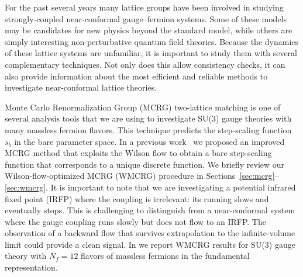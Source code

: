 
For the past several years many lattice groups have been involved in studying strongly-coupled near-conformal gauge--fermion systems.
Some of these models may be candidates for new physics beyond the standard model, while others are simply interesting non-perturbative quantum field theories.
Because the dynamics of these lattice systems are unfamiliar, it is important to study them with several complementary techniques.
Not only does this allow consistency checks, it can also provide information about the most efficient and reliable methods to investigate near-conformal lattice theories.

Monte Carlo Renormalization Group (MCRG) two-lattice matching is one of several analysis tools that we are using to investigate SU(3) gauge theories with many massless fermion flavors.
This technique predicts the step-scaling function $s_b$ in the bare parameter space.
In a previous work~\cite{Petropoulos:2012mg} we proposed an improved MCRG method that exploits the Wilson flow to obtain a bare step-scaling function that corresponds to a unique discrete \be function.
We briefly review our Wilson-flow-optimized MCRG (WMCRG) procedure in Sections~\ref{sec:mcrg}--\ref{sec:wmcrg}.
It is important to note that we are investigating a potential infrared fixed point (IRFP) where the coupling is irrelevant: its running slows and eventually stops.
This is challenging to distinguish from a near-conformal system where the gauge coupling runs slowly but does not flow to an IRFP.
The observation of a backward flow that survives extrapolation to the infinite-volume limit could provide a clean signal.
In  we report WMCRG results for SU(3) gauge theory with $N_f = 12$ flavors of massless fermions in the fundamental representation.

